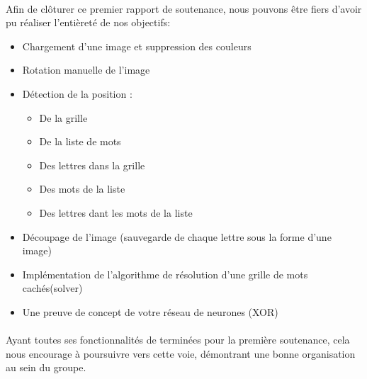 \documentclass{article}
\begin{document}
\paragraph{}
Afin de clôturer ce premier rapport de soutenance, nous pouvons être fiers d’avoir pu réaliser l’entièreté de nos objectifs:
\begin{itemize}
    \item Chargement d’une image et suppression des couleurs 
    \item Rotation manuelle de l’image 
    \item Détection de la position : 
    \begin{itemize}
        \item De la grille
        \item De la liste de mots
        \item Des lettres dans la grille
        \item Des mots de la liste
        \item Des lettres dant les mots de la liste
    \end{itemize}
    \item Découpage de l’image (sauvegarde de chaque lettre sous la forme d’une image)
    \item Implémentation de l’algorithme de résolution d’une grille de mots cachés(solver)
    \item Une preuve de concept de votre réseau de neurones (XOR)
\end{itemize}
\paragraph{}
Ayant toutes ses fonctionnalités de terminées pour la première soutenance, cela nous encourage à poursuivre vers cette voie, démontrant une bonne organisation au sein du groupe.
\end{document}

